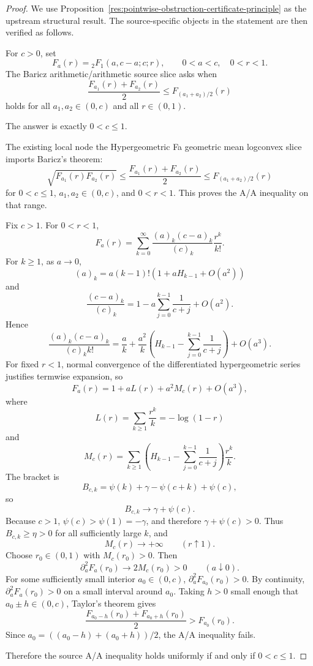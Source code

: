 \documentclass[11pt]{article}
\numberwithin{equation}{section}
\theoremstyle{definition}
\theoremstyle{remark}
\newcommand{\1}{\mathbf 1}
\begin{document}
\begin{proof}
We use Proposition~\ref{res:pointwise-obstruction-certificate-principle} as the upstream structural result. The source-specific objects in the statement are then verified as follows.

For \(c>0\), set
\[
F_a(r)={}_2F_1(a,c-a;c;r),\qquad 0<a<c,\quad 0<r<1.
\]
The Baricz arithmetic/arithmetic source slice asks when
\[
\frac{F_{a_1}(r)+F_{a_2}(r)}2\le F_{(a_1+a_2)/2}(r)
\]
holds for all \(a_1,a_2\in(0,c)\) and all \(r\in(0,1)\).

The answer is exactly \(0<c\le1\).

The existing local node the Hypergeometric Fa geometric mean logconvex slice imports Baricz's theorem:
\[
\sqrt{F_{a_1}(r)F_{a_2}(r)}
\le
\frac{F_{a_1}(r)+F_{a_2}(r)}2
\le
F_{(a_1+a_2)/2}(r)
\]
for \(0<c\le1\), \(a_1,a_2\in(0,c)\), and \(0<r<1\). This proves the A/A inequality on that range.

Fix \(c>1\). For \(0<r<1\),
\[
F_a(r)=\sum_{k=0}^{\infty}
\frac{(a)_k(c-a)_k}{(c)_k}\frac{r^k}{k!}.
\]
For \(k\ge1\), as \(a\to0\),
\[
(a)_k=a(k-1)!\left(1+aH_{k-1}+O(a^2)\right)
\]
and
\[
\frac{(c-a)_k}{(c)_k}
=
1-a\sum_{j=0}^{k-1}\frac1{c+j}+O(a^2).
\]
Hence
\[
\frac{(a)_k(c-a)_k}{(c)_k k!}
=
\frac ak+\frac{a^2}{k}
\left(
H_{k-1}-\sum_{j=0}^{k-1}\frac1{c+j}
\right)
 +O(a^3).
\]
For fixed \(r<1\), normal convergence of the differentiated hypergeometric series justifies termwise expansion, so
\[
F_a(r)=1+aL(r)+a^2M_c(r)+O(a^3),
\]
where
\[
L(r)=\sum_{k\ge1}\frac{r^k}{k}=-\log(1-r)
\]
and
\[
M_c(r)=
\sum_{k\ge1}
\left(
H_{k-1}-\sum_{j=0}^{k-1}\frac1{c+j}
\right)\frac{r^k}{k}.
\]
The bracket is
\[
B_{c,k}
=
\psi(k)+\gamma-\psi(c+k)+\psi(c),
\]
so
\[
B_{c,k}\to \gamma+\psi(c).
\]
Because \(c>1\), \(\psi(c)>\psi(1)=-\gamma\), and therefore \(\gamma+\psi(c)>0\). Thus \(B_{c,k}\ge\eta>0\) for all sufficiently large \(k\), and
\[
M_c(r)\to+\infty\qquad (r\uparrow1).
\]
Choose \(r_0\in(0,1)\) with \(M_c(r_0)>0\). Then
\[
\partial_a^2F_a(r_0)\to 2M_c(r_0)>0
\qquad (a\downarrow0).
\]
For some sufficiently small interior \(a_0\in(0,c)\), \(\partial_a^2F_{a_0}(r_0)>0\). By continuity, \(\partial_a^2F_a(r_0)>0\) on a small interval around \(a_0\). Taking \(h>0\) small enough that \(a_0\pm h\in(0,c)\), Taylor's theorem gives
\[
\frac{F_{a_0-h}(r_0)+F_{a_0+h}(r_0)}2>F_{a_0}(r_0).
\]
Since \(a_0=((a_0-h)+(a_0+h))/2\), the A/A inequality fails.

Therefore the source A/A inequality holds uniformly if and only if \(0<c\le1\).
\end{proof}
\end{document}
